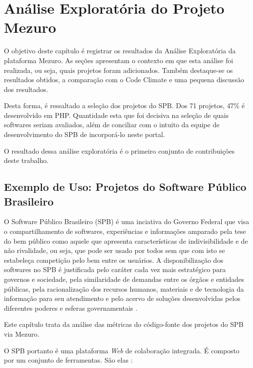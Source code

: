 \chapter{Análise Exploratória do Projeto Mezuro}\label{chap:analise_exploratoria}

O objetivo deste capítulo é registrar os resultados da Análise Exploratória da
plataforma Mezuro. As seções apresentam o contexto em que esta análise foi
realizada, ou seja, quais projetos foram adicionados. Também destaque-se os
resultados obtidos, a comparação com o Code Climate e uma pequena discussão dos
resultados.

Desta forma, é ressaltado a seleção dos projetos do SPB. Dos 71 projetos, 47\% é
desenvolvido em PHP. Quantidade esta que foi decisiva na seleção de quais
softwares seriam avaliados, além de conciliar com o intuito da equipe de
desenvolvimento do SPB de incorporá-lo neste portal.

O resultado dessa análise exploratória é o primeiro conjunto de contribuições
deste trabalho.

\section{Exemplo de Uso: Projetos do Software Público Brasileiro}

O Software Público Brasileiro (SPB) é uma inciativa do Governo Federal que visa
o compartilhamento de softwares, experiências e informações amparado pela tese
do bem público como aquele que apresenta características de indivisibilidade e
de não rivalidade, ou seja, que pode ser usado por todos sem que com isto se
estabeleça competição pelo bem entre os usuários. A disponibilização dos
softwares no SPB é justificada pelo caráter cada vez mais estratégico para
governos e sociedade, pela similaridade de demandas entre os órgãos e entidades
públicas, pela racionalização dos recursos humanos, materiais e de tecnologia
da informação para seu atendimento e pelo acervo de soluções desenvolvidas
pelos diferentes poderes e esferas governamentais \cite{santos2011in01}.

Este capítulo trata da análise das métricas do código-fonte dos projetos do SPB
via Mezuro.

O SPB portanto é uma plataforma \textit{Web} de colaboração integrada. É composto por um
conjunto de ferramentas. São elas \cite{aboutSPB}:

